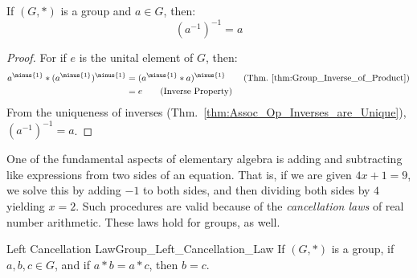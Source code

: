     \begin{theorem}
        \label{thm:Group_Inverse_of_Inverse}%
        If $(G,*)$ is a group and $a\in{G}$, then:
        \begin{equation}
            (a^{\minus{1}})^{\minus{1}}=a
        \end{equation}
    \end{theorem}
    \begin{proof}
        For if $e$ is the unital element of $G$, then:
        \begin{align}
            a^{\minus{1}}*(a^{\minus{1}})^{\minus{1}}
            &=(a^{\minus{1}}* a)^{\minus{1}}
            \tag{Thm.~\ref{thm:Group_Inverse_of_Product}}\\
            &=e
            \tag{Inverse Property}
        \end{align}
        From the uniqueness of inverses
        (Thm.~\ref{thm:Assoc_Op_Inverses_are_Unique}),
        $(a^{\minus{1}})^{\minus{1}}=a$.
    \end{proof}
    One of the fundamental aspects of elementary algebra is adding and
    subtracting like expressions from two sides of an equation. That is, if we
    are given $4x+1=9$, we solve this by adding $\minus{1}$ to both sides, and
    then dividing both sides by $4$ yielding $x=2$. Such procedures are valid
    because of the \textit{cancellation laws} of real
    number arithmetic. These laws hold for groups, as well.
    \begin{ltheorem}{Left Cancellation Law}{Group_Left_Cancellation_Law}
        If $(G,*)$ is a group, if $a,b,c\in{G}$, and if $a*b=a*c$, then $b=c$.
    \end{ltheorem}
